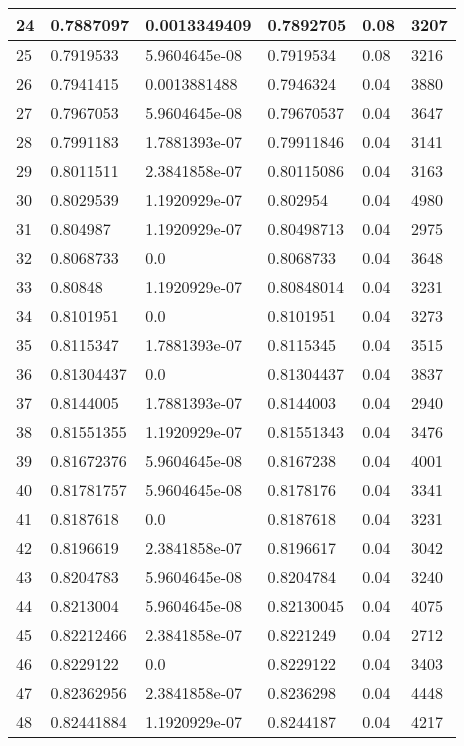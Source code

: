 \begin{longtable}{|l|l|l|l|l|l|}
24 & 0.7887097 & 0.0013349409 & 0.7892705 & 0.08 & 3207 \\ \hline 
25 & 0.7919533 & 5.9604645e-08 & 0.7919534 & 0.08 & 3216 \\ \hline 
26 & 0.7941415 & 0.0013881488 & 0.7946324 & 0.04 & 3880 \\ \hline 
27 & 0.7967053 & 5.9604645e-08 & 0.79670537 & 0.04 & 3647 \\ \hline 
28 & 0.7991183 & 1.7881393e-07 & 0.79911846 & 0.04 & 3141 \\ \hline 
29 & 0.8011511 & 2.3841858e-07 & 0.80115086 & 0.04 & 3163 \\ \hline 
30 & 0.8029539 & 1.1920929e-07 & 0.802954 & 0.04 & 4980 \\ \hline 
31 & 0.804987 & 1.1920929e-07 & 0.80498713 & 0.04 & 2975 \\ \hline 
32 & 0.8068733 & 0.0 & 0.8068733 & 0.04 & 3648 \\ \hline 
33 & 0.80848 & 1.1920929e-07 & 0.80848014 & 0.04 & 3231 \\ \hline 
34 & 0.8101951 & 0.0 & 0.8101951 & 0.04 & 3273 \\ \hline 
35 & 0.8115347 & 1.7881393e-07 & 0.8115345 & 0.04 & 3515 \\ \hline 
36 & 0.81304437 & 0.0 & 0.81304437 & 0.04 & 3837 \\ \hline 
37 & 0.8144005 & 1.7881393e-07 & 0.8144003 & 0.04 & 2940 \\ \hline 
38 & 0.81551355 & 1.1920929e-07 & 0.81551343 & 0.04 & 3476 \\ \hline 
39 & 0.81672376 & 5.9604645e-08 & 0.8167238 & 0.04 & 4001 \\ \hline 
40 & 0.81781757 & 5.9604645e-08 & 0.8178176 & 0.04 & 3341 \\ \hline 
41 & 0.8187618 & 0.0 & 0.8187618 & 0.04 & 3231 \\ \hline 
42 & 0.8196619 & 2.3841858e-07 & 0.8196617 & 0.04 & 3042 \\ \hline 
43 & 0.8204783 & 5.9604645e-08 & 0.8204784 & 0.04 & 3240 \\ \hline 
44 & 0.8213004 & 5.9604645e-08 & 0.82130045 & 0.04 & 4075 \\ \hline 
45 & 0.82212466 & 2.3841858e-07 & 0.8221249 & 0.04 & 2712 \\ \hline 
46 & 0.8229122 & 0.0 & 0.8229122 & 0.04 & 3403 \\ \hline 
47 & 0.82362956 & 2.3841858e-07 & 0.8236298 & 0.04 & 4448 \\ \hline 
48 & 0.82441884 & 1.1920929e-07 & 0.8244187 & 0.04 & 4217 \\ \hline 

\end{longtable}
